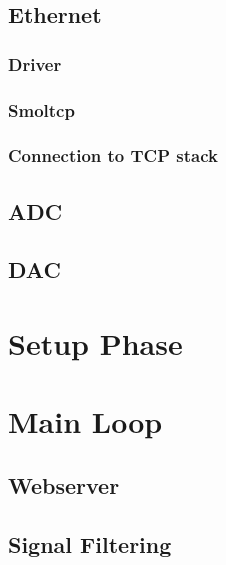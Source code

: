 \subsection{Ethernet}

\subsubsection{Driver}
\subsubsection{Smoltcp}
\subsubsection{Connection to TCP stack}

\subsection{ADC}

\subsection{DAC}


\section{Setup Phase}


\section{Main Loop}

\subsection{Webserver}

\subsection{Signal Filtering}
